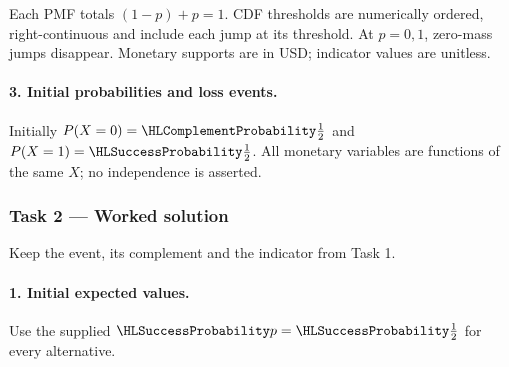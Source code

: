 Each PMF totals $(1-p)+p=1$. CDF thresholds are numerically ordered,
right-continuous and include each jump at its threshold. At $p=0,1$, zero-mass jumps disappear.
Monetary supports are in USD; indicator values are unitless.
\paragraph{3. Initial probabilities and loss events.}
Initially $P(X=0)=\FailureProb{\frac{1}{2}}$ and $P(X=1)=\SuccessProb{\frac{1}{2}}$.
All monetary variables are functions of the same $X$; no independence is asserted.
\clearpage\subsubsection*{Task 2 --- Worked solution}\label{sol:c3-coffee-decision}
Keep the event, its complement and the indicator from Task 1.
\paragraph{1. Initial expected values.}
Use the supplied $\SuccessProb{p}=\SuccessProb{\frac{1}{2}}$ for every alternative.
